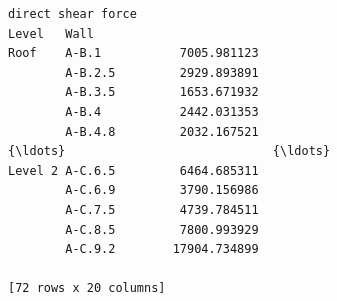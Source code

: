 \documentclass[11pt]{article}
\begin{document}
\begin{tcolorbox}[breakable, size=fbox, boxrule=.5pt, pad at break*=1mm, opacityfill=0]
\begin{Verbatim}[commandchars=\\\{\}]
                 direct shear force
Level   Wall
Roof    A-B.1           7005.981123
        A-B.2.5         2929.893891
        A-B.3.5         1653.671932
        A-B.4           2442.031353
        A-B.4.8         2032.167521
{\ldots}                             {\ldots}
Level 2 A-C.6.5         6464.685311
        A-C.6.9         3790.156986
        A-C.7.5         4739.784511
        A-C.8.5         7800.993929
        A-C.9.2        17904.734899

[72 rows x 20 columns]
\end{Verbatim}
\end{tcolorbox}
        

    
    
    
\end{document}

